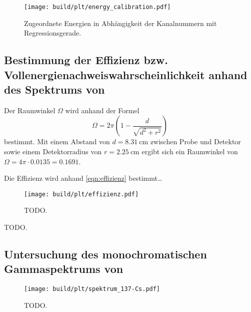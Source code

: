 \begin{figure}
    \centering
    \texttt{[image: build/plt/energy\_calibration.pdf]}
    \caption{Zugeordnete Energien in Abhängigkeit der Kanalnummern mit Regressionsgerade.}
    \label{fig:energy_calibration}
\end{figure}


\FloatBarrier %
\subsection{Bestimmung der Effizienz bzw. Vollenergienachweiswahrscheinlichkeit anhand des Spektrums von }
Der Raumwinkel $\Omega$ wird anhand der Formel
\begin{equation*}
    \Omega = 2\pi \left( 1 - \frac{d}{\sqrt{d^2 + r^2}} \right)
\end{equation*}
bestimmt.
Mit
    einem Abstand von $d = \SI{8.31}{\centi\meter}$ zwischen Probe und Detektor
    sowie einem Detektorradius von $r = \SI{2.25}{\centi\meter}$
ergibt sich ein Raumwinkel von
$\Omega = 4\pi \cdot \num{0.0135} = \num{0.1691}$.

Die Effizienz wird anhand \autoref{eqn:effizienz} bestimmt… %

\begin{figure}
    \centering
    \texttt{[image: build/plt/effizienz.pdf]}
    \caption{TODO.}
    \label{fig:effizienz}
\end{figure}

\begin{table}
    \centering
    \caption{TODO.}
    \label{tab:2_effizienz}
\end{table}


\FloatBarrier %
\subsection{Untersuchung des monochromatischen Gammaspektrums von }

\begin{figure}
    \centering
    \texttt{[image: build/plt/spektrum\_137-Cs.pdf]}
    \caption{TODO.}
    \label{fig:TODO}
\end{figure}
